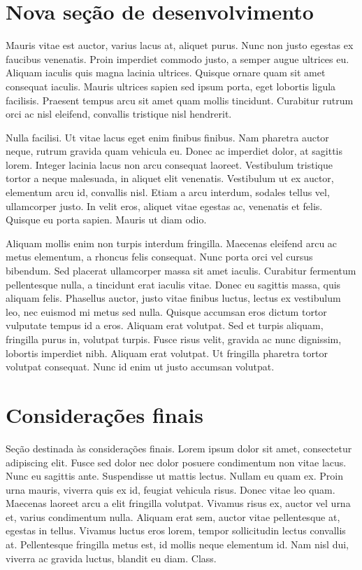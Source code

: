 \documentclass[a4paper]{article}
\begin{document}
\section{Nova seção de desenvolvimento}

Mauris vitae est auctor, varius lacus at, aliquet purus. Nunc non justo egestas ex faucibus venenatis. Proin imperdiet commodo justo, a semper augue ultrices eu. Aliquam iaculis quis magna lacinia ultrices. Quisque ornare quam sit amet consequat iaculis. Mauris ultrices sapien sed ipsum porta, eget lobortis ligula facilisis. Praesent tempus arcu sit amet quam mollis tincidunt. Curabitur rutrum orci ac nisl eleifend, convallis tristique nisl hendrerit.

Nulla facilisi. Ut vitae lacus eget enim finibus finibus. Nam pharetra auctor neque, rutrum gravida quam vehicula eu. Donec ac imperdiet dolor, at sagittis lorem. Integer lacinia lacus non arcu consequat laoreet. Vestibulum tristique tortor a neque malesuada, in aliquet elit venenatis. Vestibulum ut ex auctor, elementum arcu id, convallis nisl. Etiam a arcu interdum, sodales tellus vel, ullamcorper justo. In velit eros, aliquet vitae egestas ac, venenatis et felis. Quisque eu porta sapien. Mauris ut diam odio.

Aliquam mollis enim non turpis interdum fringilla. Maecenas eleifend arcu ac metus elementum, a rhoncus felis consequat. Nunc porta orci vel cursus bibendum. Sed placerat ullamcorper massa sit amet iaculis. Curabitur fermentum pellentesque nulla, a tincidunt erat iaculis vitae. Donec eu sagittis massa, quis aliquam felis. Phasellus auctor, justo vitae finibus luctus, lectus ex vestibulum leo, nec euismod mi metus sed nulla. Quisque accumsan eros dictum tortor vulputate tempus id a eros. Aliquam erat volutpat. Sed et turpis aliquam, fringilla purus in, volutpat turpis. Fusce risus velit, gravida ac nunc dignissim, lobortis imperdiet nibh. Aliquam erat volutpat. Ut fringilla pharetra tortor volutpat consequat. Nunc id enim ut justo accumsan volutpat.

\section{Considerações finais}

Seção destinada às considerações finais. Lorem ipsum dolor sit amet, consectetur adipiscing elit. Fusce sed dolor nec dolor posuere condimentum non vitae lacus. Nunc eu sagittis ante. Suspendisse ut mattis lectus. Nullam eu quam ex. Proin urna mauris, viverra quis ex id, feugiat vehicula risus. Donec vitae leo quam. Maecenas laoreet arcu a elit fringilla volutpat. Vivamus risus ex, auctor vel urna et, varius condimentum nulla. Aliquam erat sem, auctor vitae pellentesque at, egestas in tellus. Vivamus luctus eros lorem, tempor sollicitudin lectus convallis at. Pellentesque fringilla metus est, id mollis neque elementum id. Nam nisl dui, viverra ac gravida luctus, blandit eu diam. Class.
\end{document}
